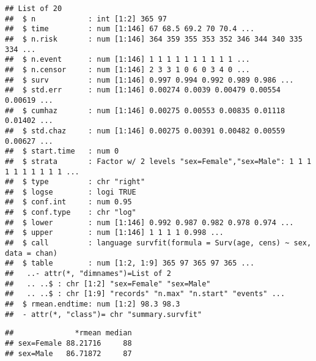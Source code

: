 \documentclass[
]{book}
\newenvironment{Shaded}{\begin{snugshade}}{\end{snugshade}}
\newcommand{\CommentTok}[1]{\textcolor[rgb]{0.56,0.35,0.01}{\textit{#1}}}
\newcommand{\KeywordTok}[1]{\textcolor[rgb]{0.13,0.29,0.53}{\textbf{#1}}}
\newcommand{\NormalTok}[1]{#1}
\newcommand{\OperatorTok}[1]{\textcolor[rgb]{0.81,0.36,0.00}{\textbf{#1}}}
\newcommand{\StringTok}[1]{\textcolor[rgb]{0.31,0.60,0.02}{#1}}
\theoremstyle{definition}
\theoremstyle{definition}
\theoremstyle{definition}
\theoremstyle{remark}
\begin{document}
\begin{verbatim}
## List of 20
##  $ n            : int [1:2] 365 97
##  $ time         : num [1:146] 67 68.5 69.2 70 70.4 ...
##  $ n.risk       : num [1:146] 364 359 355 353 352 346 344 340 335 334 ...
##  $ n.event      : num [1:146] 1 1 1 1 1 1 1 1 1 1 ...
##  $ n.censor     : num [1:146] 2 3 3 1 0 6 0 3 4 0 ...
##  $ surv         : num [1:146] 0.997 0.994 0.992 0.989 0.986 ...
##  $ std.err      : num [1:146] 0.00274 0.0039 0.00479 0.00554 0.00619 ...
##  $ cumhaz       : num [1:146] 0.00275 0.00553 0.00835 0.01118 0.01402 ...
##  $ std.chaz     : num [1:146] 0.00275 0.00391 0.00482 0.00559 0.00627 ...
##  $ start.time   : num 0
##  $ strata       : Factor w/ 2 levels "sex=Female","sex=Male": 1 1 1 1 1 1 1 1 1 1 ...
##  $ type         : chr "right"
##  $ logse        : logi TRUE
##  $ conf.int     : num 0.95
##  $ conf.type    : chr "log"
##  $ lower        : num [1:146] 0.992 0.987 0.982 0.978 0.974 ...
##  $ upper        : num [1:146] 1 1 1 1 0.998 ...
##  $ call         : language survfit(formula = Surv(age, cens) ~ sex, data = chan)
##  $ table        : num [1:2, 1:9] 365 97 365 97 365 ...
##   ..- attr(*, "dimnames")=List of 2
##   .. ..$ : chr [1:2] "sex=Female" "sex=Male"
##   .. ..$ : chr [1:9] "records" "n.max" "n.start" "events" ...
##  $ rmean.endtime: num [1:2] 98.3 98.3
##  - attr(*, "class")= chr "summary.survfit"
\end{verbatim}

\begin{Shaded}
\end{Shaded}

\begin{verbatim}
##              *rmean median
## sex=Female 88.21716     88
## sex=Male   86.71872     87
\end{verbatim}

\begin{Shaded}
\end{Shaded}
\end{document}
